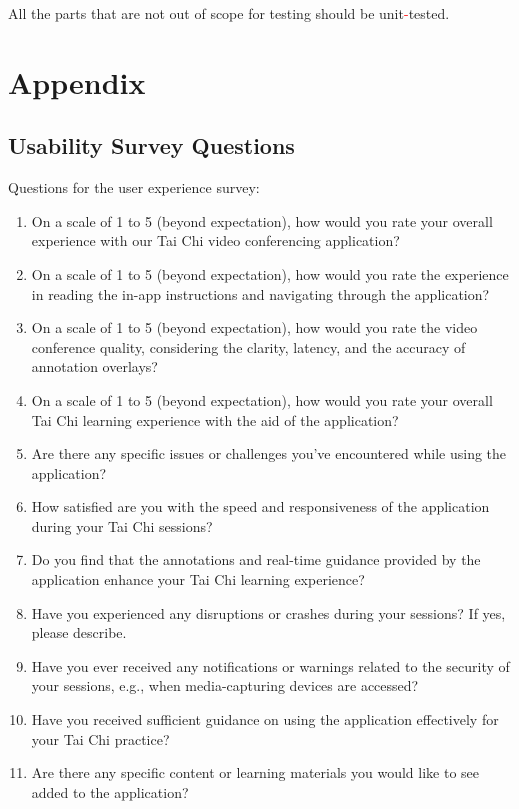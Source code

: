 \documentclass[12pt, titlepage]{article}
\newcommand{\rt}[1]{\textcolor{red}{#1}}
\begin{document}
All the parts that are not out of scope for testing should be unit\rt{-}tested.

\newpage

\section{Appendix}

\subsection{Usability Survey Questions}
\label{sec:survey}

Questions for the user experience survey:

\begin{enumerate}
\item On a scale of 1 to 5 (beyond expectation), how would you rate your overall
  experience with our Tai Chi video conferencing application?
\item On a scale of 1 to 5 (beyond expectation), how would you rate the experience
  in reading the in-app instructions and navigating through the application?
\item On a scale of 1 to 5 (beyond expectation), how would you rate the video
  conference quality, considering the clarity, latency, and the accuracy of
  annotation overlays?
\item On a scale of 1 to 5 (beyond expectation), how would you rate your overall
  Tai Chi learning experience with the aid of the application?
\item Are there any specific issues or challenges you've encountered while using
  the application?
\item How satisfied are you with the speed and responsiveness of the application
  during your Tai Chi sessions?
\item Do you find that the annotations and real-time guidance provided by the
  application enhance your Tai Chi learning experience?
\item Have you experienced any disruptions or crashes during your sessions? If yes,
  please describe.
\item Have you ever received any notifications or warnings related to the security
  of your sessions, e.g., when media-capturing devices are accessed?
\item Have you received sufficient guidance on using the application effectively
  for your Tai Chi practice?
\item Are there any specific content or learning materials you would like to see
  added to the application?
\end{enumerate}
\end{document}
